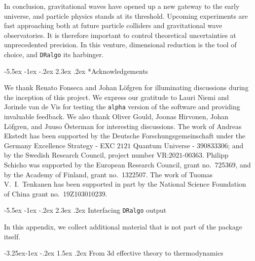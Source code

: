 \documentclass[11pt]{article}
\makeatletter
\def\dralgo{{\tt DRalgo}}
\renewcommand{\theequation}{\arabic{section}.\arabic{equation}}
\renewcommand\section{\@startsection{section}{1}{\z@}%
  {-5.5ex \@plus -1ex \@minus -.2ex}%
  {2.3ex \@plus.2ex}%
  {\normalfont\large\bfseries}}
\renewcommand\subsection{\@startsection{subsection}{2}{\z@}%
  {-3.25ex\@plus -1ex \@minus -.2ex}%
  {1.5ex \@plus .2ex}%
  {\normalfont\normalsize\bfseries}}
\renewcommand\thesection{\@arabic\c@section}
\renewcommand\thesubsection{\thesection.\@arabic\c@subsection}
\makeatother
\begin{document}
In conclusion,
gravitational waves have opened up a new gateway to the early universe, and particle physics stands at its threshold.
Upcoming experiments are fast approaching both at future
particle colliders and
gravitational wave observatories.
It is therefore important to control theoretical uncertainties
at unprecedented precision.
In this venture,
dimensional reduction is the tool of choice,
and \dralgo{} its harbinger.

%

\section*{Acknowledgements}

We thank
Renato Fonseca and
Johan L{\"o}fgren for illuminating discussions during the inception of this project.
We express our gratitude to 
Lauri Niemi and
Jorinde van de Vis
for testing the {\tt alpha} version of the software and providing invaluable feedback.
We also thank
Oliver Gould,
Joonas Hirvonen,
Johan L{\"o}fgren,
and
Juuso {\"O}sterman
for interesting discussions.
The work of Andreas Ekstedt has been supported by
the Deutsche Forschungsgemeinschaft under the Germany Excellence Strategy -
EXC $2121$ Quantum Universe - $390833306$; and by
the Swedish Research Council, project number VR:$2021$-$00363$.
Philipp Schicho was supported
by the European Research Council, grant no.~725369, and
by the Academy of Finland, grant no.~1322507.
The work of Tuomas V.~I.~Tenkanen has been supported in part
by the National Science Foundation of China grant no.~19Z103010239.


%
\appendix
\renewcommand{\thesection}{\Alph{section}}
\renewcommand{\thesubsection}{\Alph{section}.\arabic{subsection}}
\renewcommand{\theequation}{\Alph{section}.\arabic{equation}}


%
\section{Interfacing \dralgo{} output}
\label{sec:thermo}

In this appendix,
we collect additional material that is not part of the package itself. 

\subsection{From 3d effective theory to thermodynamics}
\end{document}
